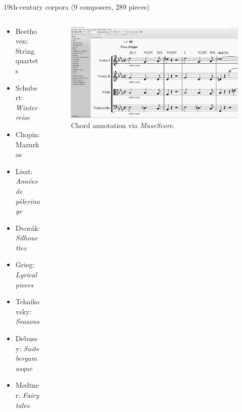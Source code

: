 \begin{frame}{\insertsectionhead}
  19th-century corpora (9 composers, 289 pieces)
  \begin{columns}
    \begin{column}{.4\linewidth}
      \begin{itemize}
        \item Beethoven: String quartets
        \item Schubert: \emph{Winterreise}
        \item Chopin: Mazurkas
        \item Liszt: \emph{Années de pèlerinage}
        \item Dvorák: \emph{Silhouettes}
        \item Grieg: \emph{Lyrical pieces}
        \item Tchaikovsky: \emph{Seasons}
        \item Debussy: \emph{Suite bergamasque}
        \item Medtner: \emph{Fairy tales}
      \end{itemize}
    \end{column}
    \pause
    \begin{column}{.6\linewidth}
      \begin{figure}
        \centering
        \includegraphics[width=\textwidth,height=.8\textheight,keepaspectratio]{img/musescore_screenshot.png}
        \caption{Chord annotation via \emph{MuseScore}.}
        \label{}
      \end{figure}
    \end{column}
  \end{columns}


\end{frame}

